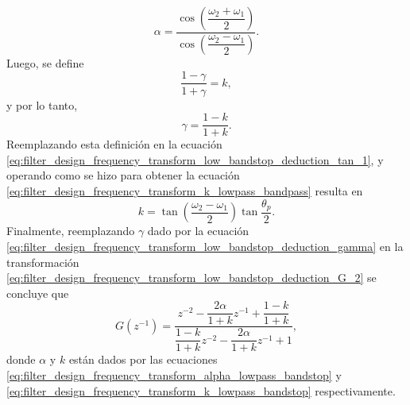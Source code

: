 \documentclass[a4paper]{report}
\begin{document}
\begin{equation}\label{eq:filter_design_frequency_transform_alpha_lowpass_bandstop}
 \alpha=\dfrac{\cos\left(\dfrac{\omega_2+\omega_1}{2}\right)}{\cos\left(\dfrac{\omega_2-\omega_1}{2}\right)}. 
\end{equation}
Luego, se define
\[
 \frac{1-\gamma}{1+\gamma}=k,
\]
y por lo tanto,
\begin{equation}\label{eq:filter_design_frequency_transform_low_bandstop_deduction_gamma}
 \gamma=\frac{1-k}{1+k}. 
\end{equation}
Reemplazando esta definición en la ecuación \ref{eq:filter_design_frequency_transform_low_bandstop_deduction_tan_1}, y operando como se hizo para obtener la ecuación \ref{eq:filter_design_frequency_transform_k_lowpass_bandpass} resulta en
\begin{equation}\label{eq:filter_design_frequency_transform_k_lowpass_bandstop}
 k=\tan\left(\dfrac{\omega_2-\omega_1}{2}\right)\tan\frac{\theta_p}{2}.
\end{equation}
Finalmente, reemplazando \(\gamma\) dado por la ecuación \ref{eq:filter_design_frequency_transform_low_bandstop_deduction_gamma} en la transformación
\ref{eq:filter_design_frequency_transform_low_bandstop_deduction_G_2} se concluye que 
\begin{equation}\label{eq:filter_design_frequency_transform_G_lowpass_bandstop}
 G(z^{-1})=\dfrac{z^{-2}-\dfrac{2\alpha}{1+k}z^{-1}+\dfrac{1-k}{1+k}}{\dfrac{1-k}{1+k}z^{-2}-\dfrac{2\alpha}{1+k}z^{-1}+1},  
\end{equation}
donde \(\alpha\) y \(k\) están dados por las ecuaciones \ref{eq:filter_design_frequency_transform_alpha_lowpass_bandstop} y \ref{eq:filter_design_frequency_transform_k_lowpass_bandstop} respectivamente.
\end{document}
